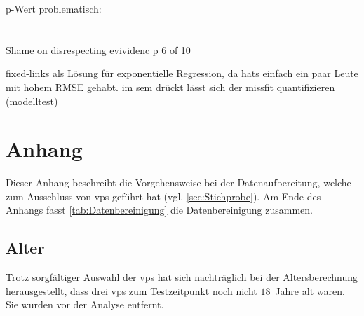 \documentclass[11pt, twoside, a4paper]{book}		%
\begin{document}
p-Wert problematisch:\\
\citet{Gelman2006}\\
\citet{Wasserstein2016}\\
\citet{Nuzzo2014}
\citet{Hayduk2014} Shame on disrespecting evividenc p 6 of 10


fixed-links als Lösung für exponentielle Regression, da hats einfach ein paar Leute mit hohem RMSE gehabt. im sem drückt lässt sich der missfit quantifizieren (modelltest)





\printglossaries	%

\renewcommand\bibname{Literatur}				%

\appendix
\setcounter{figure}{0}
\renewcommand\thefigure{\Alph{appndx}\@arabic\c@figure}
\setcounter{table}{0}
\renewcommand{\thetable}{A\arabic{table}}

\chapter{Anhang \label{cha:AAnhang}}
Dieser Anhang beschreibt die Vorgehensweise bei der Datenaufbereitung, welche zum Ausschluss von \glspl{vp} geführt hat (vgl. \autoref{sec:Stichprobe}). Am Ende des Anhangs fasst \autoref{tab:Datenbereinigung} die Datenbereinigung zusammen.

\section{Alter}
Trotz sorgfältiger Auswahl der \glspl{vp} hat sich nachträglich bei der Altersberechnung herausgestellt, dass drei \glspl{vp} zum Testzeitpunkt noch nicht $18$~Jahre alt waren. Sie wurden vor der Analyse entfernt.
\end{document}

